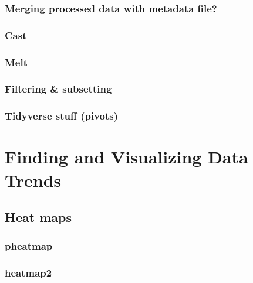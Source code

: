 \documentclass[
]{article}
\begin{document}
\hypertarget{merging-processed-data-with-metadata-file}{%
\subsubsection{Merging processed data with metadata file?}\label{merging-processed-data-with-metadata-file}}

\hypertarget{cast}{%
\subsubsection{Cast}\label{cast}}

\hypertarget{melt}{%
\subsubsection{Melt}\label{melt}}

\hypertarget{filtering-subsetting}{%
\subsubsection{Filtering \& subsetting}\label{filtering-subsetting}}

\hypertarget{tidyverse-stuff-pivots}{%
\subsubsection{Tidyverse stuff (pivots)}\label{tidyverse-stuff-pivots}}

\hypertarget{finding-and-visualizing-data-trends}{%
\section{Finding and Visualizing Data Trends}\label{finding-and-visualizing-data-trends}}

\hypertarget{heat-maps}{%
\subsection{Heat maps}\label{heat-maps}}

\hypertarget{pheatmap}{%
\subsubsection{pheatmap}\label{pheatmap}}

\hypertarget{heatmap2}{%
\subsubsection{heatmap2}\label{heatmap2}}
\end{document}

